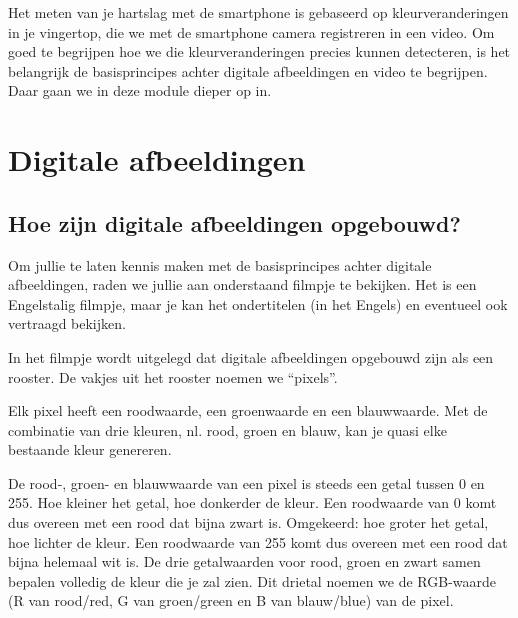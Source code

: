 \label{sec:digafbvid}

\begin{samenvatting}
Het meten van je hartslag met de smartphone is gebaseerd op kleurveranderingen in je vingertop, die we met de smartphone camera registreren in een video. Om goed te begrijpen hoe we die kleurveranderingen precies kunnen detecteren, is het belangrijk de basisprincipes achter digitale afbeeldingen en video te begrijpen. Daar gaan we in deze module dieper op in.
\end{samenvatting}
%

\section{Digitale afbeeldingen}
\label{sec:Mod3_Sec1}
%

\subsection{Hoe zijn digitale afbeeldingen opgebouwd?}

Om jullie te laten kennis maken met de basisprincipes achter digitale afbeeldingen, raden we jullie aan onderstaand filmpje te bekijken. Het is een Engelstalig filmpje, maar je kan het ondertitelen (in het Engels) en eventueel ook vertraagd bekijken.


In het filmpje wordt uitgelegd dat digitale afbeeldingen opgebouwd zijn als een rooster. De vakjes uit het rooster noemen we \textquotedblleft pixels\textquotedblright. 

Elk pixel heeft een roodwaarde, een groenwaarde en een blauwwaarde. Met de combinatie van drie kleuren, nl. rood, groen en blauw, kan je quasi elke bestaande kleur genereren. 

De rood-, groen- en blauwwaarde van een pixel is steeds een getal tussen 0 en 255. Hoe kleiner het getal, hoe donkerder de kleur. Een roodwaarde van 0 komt dus overeen met een rood dat bijna zwart is. Omgekeerd: hoe groter het getal, hoe lichter de kleur. Een roodwaarde van 255 komt dus overeen met een rood dat bijna helemaal wit is. De drie getalwaarden voor rood, groen en zwart samen bepalen volledig de kleur die je zal zien. Dit drietal noemen we de RGB-waarde (R van rood/red, G van groen/green en B van blauw/blue) van de pixel.

